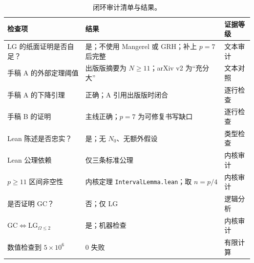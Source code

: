 \documentclass[11pt,a4paper]{ctexart}
\theoremstyle{plain}
\theoremstyle{definition}
\newcommand{\Om}{\Omega}
\newcommand{\GC}{\mathrm{GC}}
\newcommand{\LGtwo}{\mathrm{LG}_{\Om\le2}}
\newcommand{\code}[1]{\texttt{#1}}
\begin{document}
\begin{table}[htbp]
\centering
\small
\caption{闭环审计清单与结果。}
\label{tab:checklist}
\setlength{\tabcolsep}{4pt}
\begin{tabular}{@{}p{4.2cm}p{7.8cm}p{2.4cm}@{}}
\toprule
检查项 & 结果 & 证据等级 \\
\midrule
LG 的纸面证明是否自足？ & 是；不使用 Mangerel 或 GRH；补上 $p=7$ 后完整 & 文本审计 \\
手稿 A 的外部定理阈值 & 出版版摘要为 $N\ge11$；arXiv v2 为“充分大” & 文本对照 \\
手稿 A 的下降引理 & 正确；A 引用出版版时闭合 & 逐行检查 \\
手稿 B 的证明 & 主线正确；$p=7$ 为可修复书写缺口 & 逐行检查 \\
Lean 陈述是否忠实？ & 是；无 $N_0$、无额外假设 & 类型检查 \\
Lean 公理依赖 & 仅三条标准公理 & 内核审计 \\
$p\ge11$ 区间非空性 & 内核定理 \code{IntervalLemma.lean}；取 $n=p/4$ & 内核审计 \\
是否证明 GC？ & 否；仅 LG & 逻辑分析 \\
$\GC\iff\LGtwo$ & 是；机器检查 & 内核审计 \\
数值检查到 $5\times10^6$ & 0 失败 & 有限计算 \\
\bottomrule
\end{tabular}
\end{table}
\end{document}
